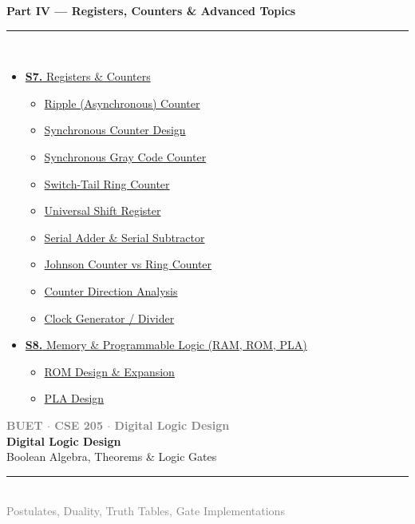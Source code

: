 \documentclass[12pt,a3paper]{article}
\newcommand{\secdivider}[4]{%
  \newpage\thispagestyle{empty}%
  \vspace*{\fill}%
  \begin{tcolorbox}[enhanced,colback=#4!7,colframe=#3,boxrule=1.5pt,arc=8pt,
    left=20pt,right=20pt,top=22pt,bottom=22pt,
    shadow={3pt}{-3pt}{0pt}{black!15}]
    \centering
    {\large\textcolor{gray}{\textbf{BUET $\cdot$ CSE 205 $\cdot$ Digital Logic Design}}}\\[8pt]
    {\fontsize{26}{32}\selectfont\bfseries\textcolor{#3}{Digital Logic Design}}\\[6pt]
    {\fontsize{15}{19}\selectfont\textcolor{dgray}{#1}}\\[12pt]
    \textcolor{#3!60}{\rule{0.5\textwidth}{0.5pt}}\\[6pt]
    {\small\textcolor{gray}{#2}}
  \end{tcolorbox}%
  \vspace*{\fill}\newpage%
}
\begin{document}
\begin{tcolorbox}[breakable,colback=cG!5,colframe=cG,boxrule=1pt,arc=5pt,
  left=8pt,right=8pt,top=8pt,bottom=8pt,before skip=4pt]
  {\large\bfseries\textcolor{cG}{Part IV --- Registers, Counters \& Advanced Topics}}\\[5pt]
  \textcolor{cG!40}{\rule{\textwidth}{0.4pt}}\\[3pt]
  \small\begin{itemize}[leftmargin=1.2em,itemsep=1pt,label={\textcolor{cG}{$\triangleright$}}]
    \item \hyperref[sec:S7]{\textbf{S7.} Registers \& Counters}
      \begin{itemize}[leftmargin=1.5em,itemsep=0pt,label={\textcolor{cG}{$\cdot$}}]
        \item \hyperref[sub:s7-ripple]{Ripple (Asynchronous) Counter}
        \item \hyperref[sub:s7-sync-counter]{Synchronous Counter Design}
        \item \hyperref[sub:s7-gray]{Synchronous Gray Code Counter}
        \item \hyperref[sub:s7-ring]{Switch-Tail Ring Counter}
        \item \hyperref[sub:s7-universal]{Universal Shift Register}
        \item \hyperref[sub:s7-serial]{Serial Adder \& Serial Subtractor}
        \item \hyperref[sub:s7-johnson]{Johnson Counter vs Ring Counter}
        \item \hyperref[sub:s7-direction]{Counter Direction Analysis}
        \item \hyperref[sub:s7-clock]{Clock Generator / Divider}
      \end{itemize}
    \item \hyperref[sec:S8]{\textbf{S8.} Memory \& Programmable Logic (RAM, ROM, PLA)}
      \begin{itemize}[leftmargin=1.5em,itemsep=0pt,label={\textcolor{cG}{$\cdot$}}]
        \item \hyperref[sub:s8-rom]{ROM Design \& Expansion}
        \item \hyperref[sub:s8-pla]{PLA Design}
      \end{itemize}
  \end{itemize}
\end{tcolorbox}

\newpage

\secdivider{Boolean Algebra, Theorems \& Logic Gates}{Postulates, Duality, Truth Tables, Gate Implementations}{cA}{cA}
\end{document}
